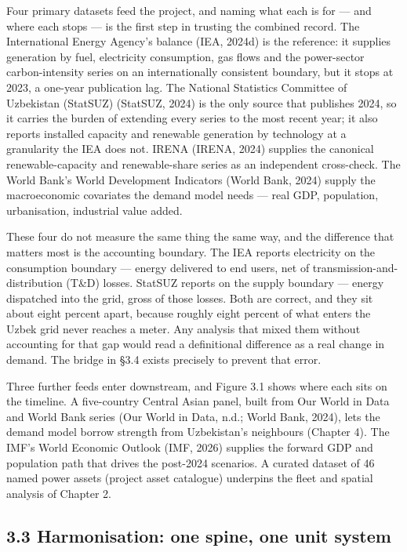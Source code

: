 \documentclass[10pt,twocolumn]{article}
\begin{document}
Four primary datasets feed the project, and naming what each is for --- and where each stops --- is the first step in trusting the combined record. The International Energy Agency's balance (IEA, 2024d) is the reference: it supplies generation by fuel, electricity consumption, gas flows and the power-sector carbon-intensity series on an internationally consistent boundary, but it stops at 2023, a one-year publication lag. The National Statistics Committee of Uzbekistan (StatSUZ) (StatSUZ, 2024) is the only source that publishes 2024, so it carries the burden of extending every series to the most recent year; it also reports installed capacity and renewable generation by technology at a granularity the IEA does not. IRENA (IRENA, 2024) supplies the canonical renewable-capacity and renewable-share series as an independent cross-check. The World Bank's World Development Indicators (World Bank, 2024) supply the macroeconomic covariates the demand model needs --- real GDP, population, urbanisation, industrial value added.

These four do not measure the same thing the same way, and the difference that matters most is the accounting boundary. The IEA reports electricity on the consumption boundary --- energy delivered to end users, net of transmission-and-distribution (T\&D) losses. StatSUZ reports on the supply boundary --- energy dispatched into the grid, gross of those losses. Both are correct, and they sit about eight percent apart, because roughly eight percent of what enters the Uzbek grid never reaches a meter. Any analysis that mixed them without accounting for that gap would read a definitional difference as a real change in demand. The bridge in \S{}3.4 exists precisely to prevent that error.

Three further feeds enter downstream, and Figure 3.1 shows where each sits on the timeline. A five-country Central Asian panel, built from Our World in Data and World Bank series (Our World in Data, n.d.; World Bank, 2024), lets the demand model borrow strength from Uzbekistan's neighbours (Chapter 4). The IMF's World Economic Outlook (IMF, 2026) supplies the forward GDP and population path that drives the post-2024 scenarios. A curated dataset of 46 named power assets (project asset catalogue) underpins the fleet and spatial analysis of Chapter 2.

\subsection*{3.3 Harmonisation: one spine, one unit system}
\end{document}
